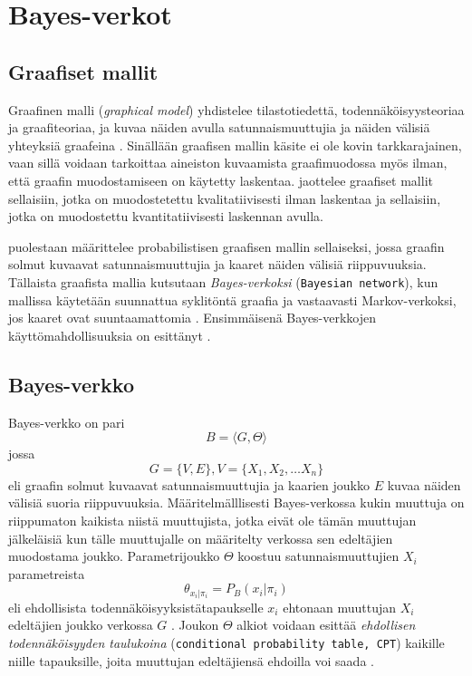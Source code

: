 \chapter{Bayes-verkot\label{bayes}}

\section{Graafiset mallit}
Graafinen malli (\emph{graphical model}) yhdistelee tilastotiedettä, todennäköisyysteoriaa ja graafiteoriaa, ja kuvaa näiden avulla satunnaismuuttujia ja näiden välisiä yhteyksiä graafeina \citep{jordan_graphical_2004}. Sinällään graafisen mallin käsite ei ole kovin tarkkarajainen, vaan sillä voidaan tarkoittaa aineiston kuvaamista graafimuodossa myös ilman, että graafin muodostamiseen on käytetty laskentaa. \citet{ramsahai_connecting_2020} jaottelee graafiset mallit sellaisiin, jotka on muodostetettu kvalitatiivisesti ilman laskentaa ja sellaisiin, jotka on muodostettu kvantitatiivisesti laskennan avulla. 

\citet{jordan_graphical_2004} puolestaan määrittelee probabilistisen graafisen mallin sellaiseksi, jossa graafin solmut kuvaavat satunnaismuuttujia ja kaaret näiden välisiä riippuvuuksia. Tällaista graafista mallia kutsutaan \emph{Bayes-verkoksi} (\texttt{Bayesian network}), kun mallissa käytetään suunnattua syklitöntä graafia ja vastaavasti Markov-verkoksi, jos kaaret ovat suuntaamattomia \citep{ruggeri_bayesian_2008}. Ensimmäisenä Bayes-verkkojen käyttömahdollisuuksia on esittänyt \citet{pearl1986fusion}.

\section{Bayes-verkko}
Bayes-verkko on pari 
$$
    B = \langle G, \Theta \rangle
$$
jossa 
$$
    G = \{V, E\}, V = \{X_1, X_2,\ldots X_n\}
$$ 
eli graafin solmut kuvaavat satunnaismuuttujia ja kaarien joukko $E$ kuvaa näiden välisiä suoria riippuvuuksia. Määritelmälllisesti Bayes-verkossa kukin muuttuja on riippumaton kaikista niistä muuttujista, jotka eivät ole tämän muuttujan jälkeläisiä kun tälle muuttujalle on määritelty verkossa sen edeltäjien muodostama joukko. Parametrijoukko $\Theta$ koostuu satunnaismuuttujien $X_i$ parametreista 
$$
    \theta_{x_i|\pi_i} = P_B(x_i|\pi_i)
$$ 
eli ehdollisista todennäköisyyksistätapaukselle $x_i$ ehtonaan muuttujan $X_i$ edeltäjien joukko verkossa $G$ \citep{ruggeri_bayesian_2008, myllymaki_bayes-verkkojen_1998}. Joukon $\Theta$ alkiot voidaan esittää \emph{ehdollisen todennäköisyyden taulukoina}  (\texttt{conditional probability table, CPT}) kaikille niille tapauksille, joita muuttujan edeltäjiensä ehdoilla voi saada \citep{zhang_brief_2019}.

